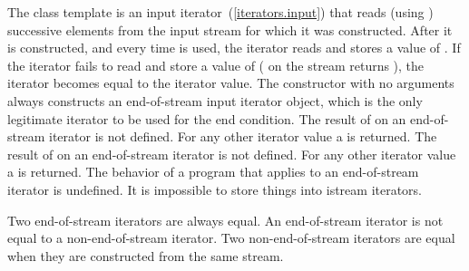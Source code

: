 \pnum
{}%
The class template
is an input iterator~(\ref{iterators.input}) that
reads (using
)
successive elements from the input stream for which it was constructed.
After it is constructed, and every time
\tcode{++}
is used, the iterator reads and stores a value of
.
If the iterator fails to read and store a value of 
(
on the stream returns
),
the iterator becomes equal to the
iterator value.
The constructor with no arguments
always constructs
an end-of-stream input iterator object, which is the only legitimate iterator to be used
for the end condition.
The result of
on an end-of-stream iterator is not defined.
For any other iterator value a
is returned.
The result of
on an end-of-stream iterator is not defined.
For any other iterator value a
is returned.
The behavior of a program that applies  to an end-of-stream
iterator is undefined.
It is impossible to store things into istream iterators.

\pnum
Two end-of-stream iterators are always equal.
An end-of-stream iterator is not
equal to a non-end-of-stream iterator.
Two non-end-of-stream iterators are equal when they are constructed from the same stream.

